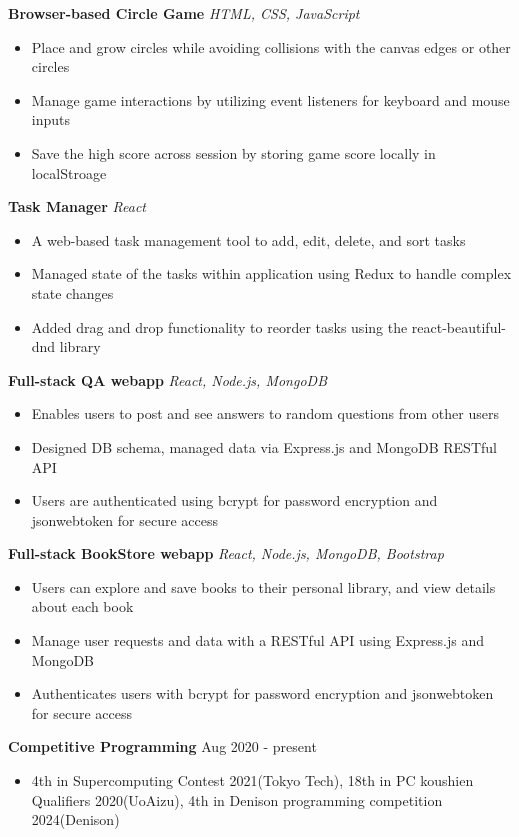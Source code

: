 \documentclass[a4paper,12pt]{article}
\begin{document}
\textbf{Browser-based Circle Game}
\href{https://uliba3.github.io/CircleGame/}{\faGlobe}
\href{https://github.com/uliba3/CircleGame}{\faGithub}
\textit{HTML, CSS, JavaScript}
\begin{itemize}
    \item Place and grow circles while avoiding collisions with the canvas edges or other circles
    \item Manage game interactions by utilizing event listeners for keyboard and mouse inputs
    \item Save the high score across session by storing game score locally in localStroage
\end{itemize}
\textbf{Task Manager}
\href{https://uliba3.github.io/TaskManager/}{\faGlobe}
\href{https://github.com/uliba3/TaskManager}{\faGithub}
\textit{React}
\begin{itemize}
    \item A web-based task management tool to add, edit, delete, and sort tasks
    \item Managed state of the tasks within application using Redux to handle complex state changes
    \item Added drag and drop functionality to reorder tasks using the react-beautiful-dnd library
\end{itemize}
\textbf{Full-stack QA webapp}
\href{https://white-voice-4708.fly.dev/}{\faGlobe}
\href{https://github.com/uliba3/Q-A-backend}{\faGithub}
\textit{React, Node.js, MongoDB}
\begin{itemize}
    \item Enables users to post and see answers to random questions from other users
    \item Designed DB schema, managed data via Express.js and MongoDB RESTful API
    \item Users are authenticated using bcrypt for password encryption and jsonwebtoken for secure access
\end{itemize}
\textbf{Full-stack BookStore webapp}
\href{https://bookstore-backend.fly.dev/}{\faGlobe}
\href{https://github.com/uliba3/BookStore-backend}{\faGithub}
\textit{React, Node.js, MongoDB, Bootstrap}
\begin{itemize}
    \item Users can explore and save books to their personal library, and view details about each book
    \item Manage user requests and data with a RESTful API using Express.js and MongoDB
    \item Authenticates users with bcrypt for password encryption and jsonwebtoken for secure access
\end{itemize}

\textbf{Competitive Programming} \hfill \textnormal{Aug 2020 - present}
\begin{itemize}
    \item 4th in Supercomputing Contest 2021(Tokyo Tech), 18th in PC koushien Qualifiers 2020(UoAizu), 4th in Denison programming competition 2024(Denison)
\end{itemize}
\end{document}
